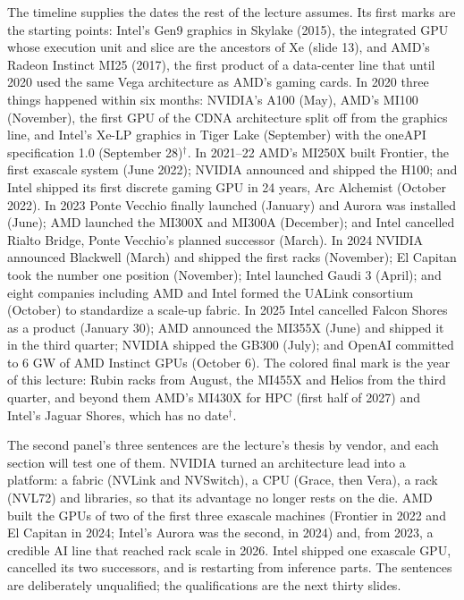 \documentclass[11pt,letterpaper]{article}
\begin{document}
The timeline supplies the dates the rest of the lecture assumes. Its first marks are the starting points: Intel's Gen9 graphics in Skylake (2015), the integrated GPU whose execution unit and slice are the ancestors of Xe (slide 13), and AMD's Radeon Instinct MI25 (2017), the first product of a data-center line that until 2020 used the same Vega architecture as AMD's gaming cards. In 2020 three things happened within six months: NVIDIA's A100 (May), AMD's MI100 (November), the first GPU of the CDNA architecture split off from the graphics line, and Intel's Xe-LP graphics in Tiger Lake (September) with the oneAPI specification 1.0 (September 28)$^\dagger$. In 2021--22 AMD's MI250X built Frontier, the first exascale system (June 2022); NVIDIA announced and shipped the H100; and Intel shipped its first discrete gaming GPU in 24 years, Arc Alchemist (October 2022). In 2023 Ponte Vecchio finally launched (January) and Aurora was installed (June); AMD launched the MI300X and MI300A (December); and Intel cancelled Rialto Bridge, Ponte Vecchio's planned successor (March). In 2024 NVIDIA announced Blackwell (March) and shipped the first racks (November); El Capitan took the number one position (November); Intel launched Gaudi 3 (April); and eight companies including AMD and Intel formed the UALink consortium (October) to standardize a scale-up fabric. In 2025 Intel cancelled Falcon Shores as a product (January 30); AMD announced the MI355X (June) and shipped it in the third quarter; NVIDIA shipped the GB300 (July); and OpenAI committed to 6 GW of AMD Instinct GPUs (October 6). The colored final mark is the year of this lecture: Rubin racks from August, the MI455X and Helios from the third quarter, and beyond them AMD's MI430X for HPC (first half of 2027) and Intel's Jaguar Shores, which has no date$^\dagger$.

The second panel's three sentences are the lecture's thesis by vendor, and each section will test one of them. NVIDIA turned an architecture lead into a platform: a fabric (NVLink and NVSwitch), a CPU (Grace, then Vera), a rack (NVL72) and libraries, so that its advantage no longer rests on the die. AMD built the GPUs of two of the first three exascale machines (Frontier in 2022 and El Capitan in 2024; Intel's Aurora was the second, in 2024) and, from 2023, a credible AI line that reached rack scale in 2026. Intel shipped one exascale GPU, cancelled its two successors, and is restarting from inference parts. The sentences are deliberately unqualified; the qualifications are the next thirty slides.
\end{document}
